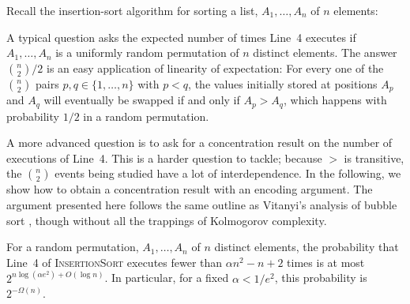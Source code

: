 \documentclass[lotsofwhite]{patmorin}
\begin{document}
Recall the insertion-sort algorithm for sorting a list, $A_1,\ldots,A_n$
of $n$ elements:

\begin{algorithmic}[1]
     \ENDWHILE
  \ENDFOR
\end{algorithmic}

A typical question asks the expected number of times Line~4 executes
if $A_1,\ldots,A_n$ is a uniformly random permutation of $n$ distinct
elements.  The answer $\binom{n}{2}/2$ is an easy application of
linearity of expectation: For every one of the $\binom{n}{2}$ pairs
$p,q\in\{1,\ldots,n\}$ with $p<q$, the values initially stored at
positions $A_p$ and $A_q$ will eventually be swapped if and only if $A_p >
A_q$, which happens with probability $1/2$ in a random permutation.

A more advanced question is to ask for a concentration result on the
number of executions of Line~4. This is a harder question to tackle;
because $>$ is transitive, the $\binom{n}{2}$ events being studied have
a lot of interdependence. In the following, we show how to obtain a
concentration result with an encoding argument.  The argument presented
here follows the same outline as Vitanyi's analysis of bubble sort
\cite{vXX}, though without all the trappings of Kolmogorov complexity.

\begin{thm}
For a random permutation, $A_1,\ldots,A_n$ of $n$ distinct elements,
the probability that Line~4 of \textsc{InsertionSort} executes fewer
than $\alpha n^2 - n + 2$ times is at most $2^{n\log(\alpha e^2)+O(\log
n)}$.  In particular, for a fixed $\alpha < 1/e^2$, this probability
is $2^{-\Omega(n)}$.
\end{thm}
\end{document}
